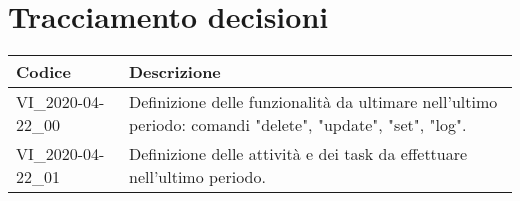 \section{Tracciamento decisioni}
\renewcommand{\arraystretch}{1.8}

\begin{longtable}{|p{5cm}|p{8cm}|}
	\hline
	
	\rowcolor{header}
	\textbf{Codice} &  \textbf{Descrizione}\\
	
	\hline
	
	VI\_2020-04-22\_00 & Definizione delle funzionalità da ultimare nell'ultimo periodo: comandi "delete", "update", "set", "log".\\
	VI\_2020-04-22\_01 & Definizione delle attività e dei task da effettuare nell'ultimo periodo.\\
	\hline
\end{longtable}